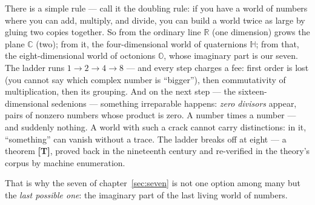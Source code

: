 \documentclass[11pt,letterpaper]{article}
\newcommand{\stT}{\textbf{[T]}\xspace}
\begin{document}
There is a simple rule --- call it the doubling rule: if you have a
world of numbers where you can add, multiply, and divide, you can
build a world twice as large by gluing two copies together. So from
the ordinary line $\mathbb{R}$ (one dimension) grows the plane
$\mathbb{C}$ (two); from it, the four-dimensional world of
quaternions $\mathbb{H}$; from that, the eight-dimensional world of
octonions $\mathbb{O}$, whose imaginary part is our seven. The ladder
runs $1 \to 2 \to 4 \to 8$ --- and every step charges a fee: first
order is lost (you cannot say which complex number is ``bigger''),
then commutativity of multiplication, then its grouping. And on the
next step --- the sixteen-dimensional sedenions --- something
irreparable happens: \emph{zero divisors} appear, pairs of nonzero
numbers whose product is zero. A number times a number --- and
suddenly nothing. A world with such a crack cannot carry
distinctions: in it, ``something'' can vanish without a trace. The
ladder breaks off at eight --- a theorem \stT, proved back in the
nineteenth century and re-verified in the theory's corpus by machine
enumeration.

That is why the seven of chapter~\ref{sec:seven} is not one option
among many but the \emph{last possible one}: the imaginary part of
the last living world of numbers.
\end{document}
